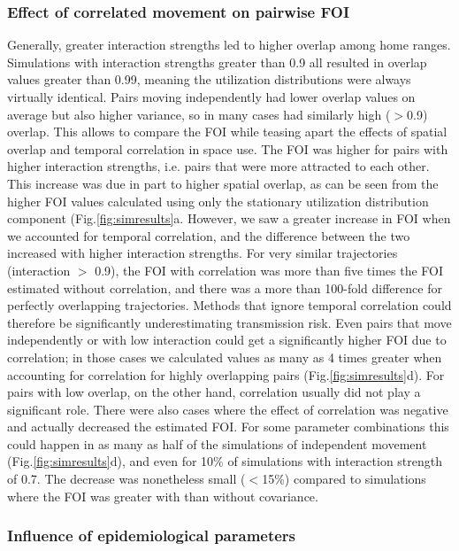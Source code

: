 \documentclass[letterpaper]{article}
\begin{document}
\subsubsection*{Effect of correlated movement on pairwise FOI}
Generally, greater interaction strengths led to higher overlap among home ranges. Simulations with interaction strengths greater than 0.9 all resulted in overlap values greater than 0.99, meaning the utilization distributions were always virtually identical. Pairs moving independently had lower overlap values on average but also higher variance, so in many cases had similarly high ($>$0.9) overlap. This allows to compare the FOI while teasing apart the effects of spatial overlap and temporal correlation in space use. 
The FOI was higher for pairs with higher interaction strengths, i.e. pairs that were more attracted to each other. This increase was due in part to higher spatial overlap, as can be seen from the higher FOI values calculated using only the stationary utilization distribution component (Fig.\ref{fig:simresults}a. However, we saw a greater increase in FOI when we accounted for temporal correlation, and the difference between the two increased with higher interaction strengths. For very similar trajectories (interaction $>$ 0.9), the FOI with correlation was more than five times the FOI estimated without correlation, and there was a more than 100-fold difference for perfectly overlapping trajectories.
Methods that ignore temporal correlation could therefore be significantly underestimating transmission risk. Even pairs that move independently or with low interaction could get a significantly higher FOI due to correlation; in those cases we calculated values as many as 4 times greater when accounting for correlation for highly overlapping pairs (Fig.\ref{fig:simresults}d). For pairs with low overlap, on the other hand, correlation usually did not play a significant role. There were also cases where the effect of correlation was negative and actually decreased the estimated FOI. For some parameter combinations this could happen in as many as half of the simulations of independent movement (Fig.\ref{fig:simresults}d), and even for 10\% of simulations with interaction strength of 0.7. The decrease was nonetheless small ($<$15\%) compared to simulations where the FOI was greater with than without covariance. 

\subsubsection*{Influence of epidemiological parameters}
\end{document}
